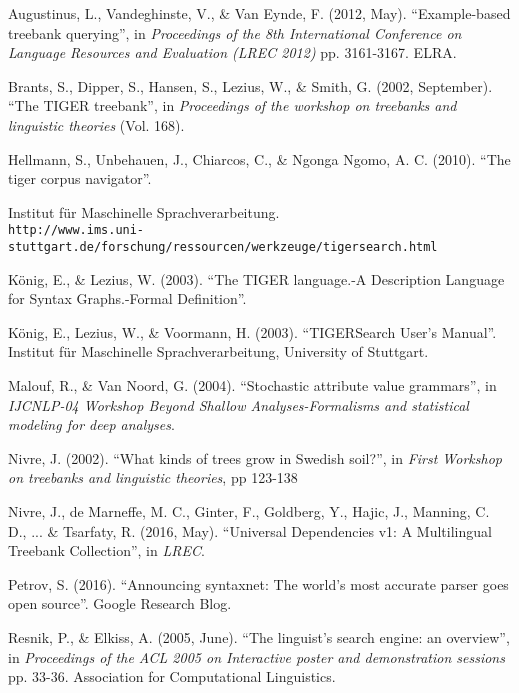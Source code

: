 \documentclass[]{scrartcl}
\theoremstyle{exmp}
\begin{document}
\newpage
{}
\begin{thebibliography}{20}

Augustinus, L., Vandeghinste, V., \& Van Eynde, F. (2012, May). ``Example-based treebank querying'', in \textit{Proceedings of the 8th International Conference on Language Resources and Evaluation (LREC 2012)} pp. 3161-3167. ELRA.

Brants, S., Dipper, S., Hansen, S., Lezius, W., \& Smith, G. (2002, September). ``The TIGER treebank'', in \textit{Proceedings of the workshop on treebanks and linguistic theories} (Vol. 168).

Hellmann, S., Unbehauen, J., Chiarcos, C., \& Ngonga Ngomo, A. C. (2010). ``The tiger corpus navigator''.

Institut f\"ur Maschinelle Sprachverarbeitung.\\
\texttt{http://www.ims.uni-stuttgart.de/forschung/ressourcen/werkzeuge/tiger\allowbreak search.html} 

K\"onig, E., \& Lezius, W. (2003). 
``The TIGER language.-A Description Language for Syntax Graphs.-Formal Definition''.

König, E., Lezius, W., \& Voormann, H. (2003). ``TIGERSearch User’s Manual''. Institut f\"ur Maschinelle Sprachverarbeitung, University of Stuttgart.

Malouf, R., \& Van Noord, G. (2004). ``Stochastic attribute value grammars'', in \textit{IJCNLP-04 Workshop Beyond Shallow Analyses-Formalisms and statistical modeling for deep analyses}.

Nivre, J. (2002). 
``What kinds of trees grow in Swedish soil?{''}, in \textit{First Workshop on treebanks and linguistic theories}, pp 123-138

Nivre, J., de Marneffe, M. C., Ginter, F., Goldberg, Y., Hajic, J., Manning, C. D., ... \& Tsarfaty, R. (2016, May). ``Universal Dependencies v1: A Multilingual Treebank Collection'', in \textit{LREC}.

Petrov, S. (2016). ``Announcing syntaxnet: The world’s most accurate parser goes open source''. Google Research Blog.

Resnik, P., \& Elkiss, A. (2005, June). ``The linguist's search engine: an overview'', in \textit{Proceedings of the ACL 2005 on Interactive poster and demonstration sessions} pp. 33-36. Association for Computational Linguistics.


\end{thebibliography}
\end{document}
